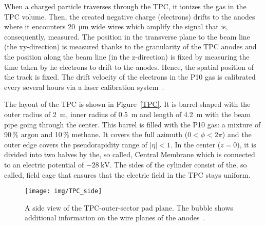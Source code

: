  

When a charged particle traverses through the TPC, it ionizes the gas in the TPC volume. Then, the created negative 
charge (electrons) drifts to the anodes where it encounters \SI{20}{\micro\metre} wide wires which amplify the signal that is,
consequently, measured. The position in the transverse plane to the beam line (the xy-direction) is measured thanks to the
granularity of the TPC anodes and the position along the beam line (in the z-direction) is fixed by measuring the time taken by
he electrons to drift to the anodes. Hence, the spatial position of the track is fixed. The drift velocity of the electrons
in the P10 gas is calibrated every several hours via a laser calibration system~\cite{laser}. 


The layout of the TPC is shown in Figure~\ref{TPC}. It is barrel-shaped with the outer radius of \SI{2}{\metre}, inner radius of \SI{0.5}{\metre} and length of \SI{4.2}{\metre}
with the beam pipe going through the center. This barrel is filled with the P10 gas: a mixture of 90$\,\%$ argon and 10$\,\%$ methane. It covers the full azimuth ($0 < \phi < 2\pi$) and the outer edge covers the
pseudorapidity range of $|\eta| < 1$. 
In the center ($z = 0$), it is divided into two halves by the, so called, Central Membrane which is connected to an electric 
potential of $-\SI{28}{\kilo\volt}$\@.  The sides of the cylinder consist of the, so called, field cage that ensures that the electric field in the TPC stays uniform.

\begin{figure}[htb]
\begin{center}
 \texttt{[image: img/TPC\_side]}\\
\end{center}
\caption{\label{TPCside}A side view of the TPC-outer-sector pad plane. The bubble shows additional information on the wire planes of the anodes~\cite{TpcNim}.}
\end{figure}

